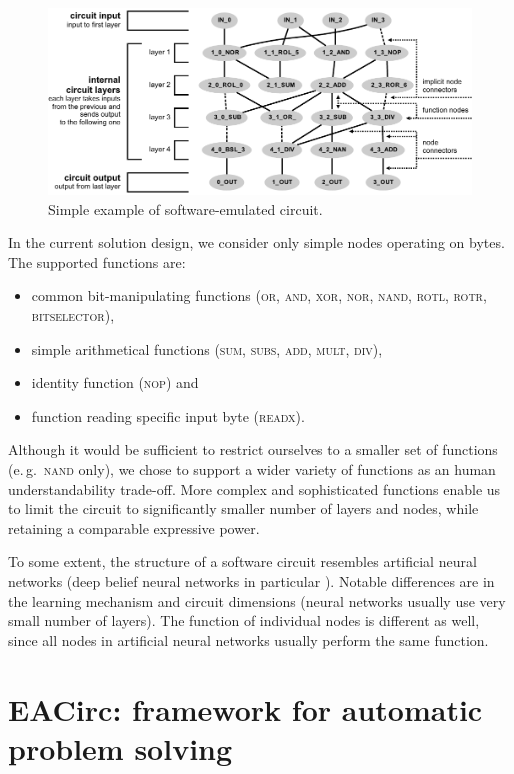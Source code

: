\documentclass[12pt,oneside]{fithesis2}		%
\renewcommand{\_}{\leavevmode \kern0.0em\vbox{\hrule width0.4em}}
\newcommand{\squarebullet}{\textcolor{black}{\raisebox{0.15em}{\rule{4pt}{4pt}}}}
\newenvironment{myItemize}{
  \begin{itemize}[leftmargin=2em,rightmargin=1em,itemsep=\parskip ,parsep=0em,topsep=0em,partopsep=0em]
  \renewcommand{\labelitemi}{\squarebullet}
  \renewcommand{\labelitemii}{$\diamond$}
}{
  \end{itemize}
}
\begin{document}
\begin{figure}[t!]
\centering
\includegraphics[width=\textwidth]{images/circuit-final}
\caption{Simple example of software-emulated circuit.}
\label{fig:circuit-example}
\end{figure}

In the current solution design, we consider only simple nodes operating on bytes. The supported functions are:
\begin{myItemize}
\item common bit-manipulating functions (\textsc{or, and, xor, nor, nand, rotl, rotr, bitselector}),
\item simple arithmetical functions (\textsc{sum, subs, add, mult, div}),
\item identity function (\textsc{nop}) and
\item function reading specific input byte (\textsc{readx}).
\end{myItemize}

\noindent
Although it would be sufficient to restrict ourselves to a smaller set of functions (e.\,g.\ \textsc{nand} only),
we chose to support a wider variety of functions as an human understandability trade-off.
More complex and sophisticated functions enable us to limit the circuit to significantly smaller number of layers and nodes,
while retaining a comparable expressive power.

To some extent, the structure of a software circuit resembles artificial neural networks 
(deep belief neural networks in particular \parencite{neural-networks}). Notable differences are in
the learning mechanism and circuit dimensions (neural networks usually use very small number of layers). 
The function of individual nodes is different as well, since all nodes in artificial neural networks usually perform the same function.

\section{EACirc: framework for automatic problem solving}
\label{sec:eacirc-principles}
\end{document}
